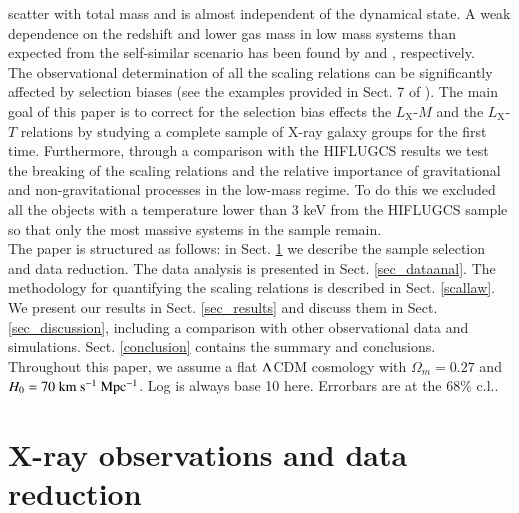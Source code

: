 \documentclass{aa} %
\begin{document}
scatter with total mass and is almost independent of the dynamical
state. A weak dependence on the redshift and lower gas mass in low
mass systems than expected from the self-similar scenario has been
found by \citet{2003ApJ...590...15V} and \citet{2008A&A...482..451Z},
respectively.\\
The observational determination of all the scaling relations can be significantly affected by selection biases (see the examples provided in Sect. 7 of \citealt{2013SSRv..177..247G}). The main goal of this paper is to correct for the selection bias effects the $L_\text{X}$-$M$ and the $L_\text{X}$-$T$ relations by studying a complete sample of X-ray galaxy groups for the first time. Furthermore, through a comparison with the HIFLUGCS results we test the breaking of the scaling relations and the relative importance
of gravitational and non-gravitational processes in the low-mass regime. To do this we excluded all the objects with a temperature lower than 3 keV from the HIFLUGCS sample so that only the most massive systems in the sample remain.\\
The paper is structured as follows: in Sect. \ref{sec_datared} we
describe the sample selection and data reduction. The
data analysis is presented in Sect. \ref{sec_dataanal}. The methodology for  quantifying the scaling relations is described in Sect. \ref{scallaw}. We present our
results in Sect. \ref{sec_results} and discuss them in Sect. \ref{sec_discussion}, including a comparison with other observational data and simulations. Sect. \ref{conclusion} contains the
summary and conclusions. Throughout this paper, we assume a flat
${\rm\Lambda}$CDM cosmology with $\Omega_m=0.27$ and $H_0=70 \ \rm{km
  \ s^{-1} \ Mpc^{-1}}$. Log is always base 10 here. Errorbars are at the 68$\%$ c.l..



\section{X-ray observations and data reduction} \label{sec_datared}
\end{document}
